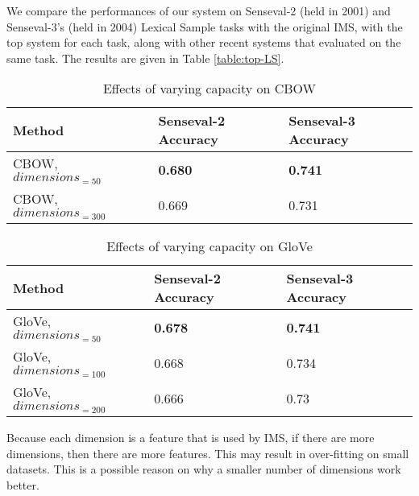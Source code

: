 \documentclass[11pt]{article}
\begin{document}
We compare the performances of our system on Senseval-2 (held in 2001) and Senseval-3's (held in 2004) Lexical Sample tasks with the original IMS, with the top system for each task, along with other recent systems that evaluated on the same task. The results are given in Table \ref{table:top-LS}.


\begin{table}[ht]
	\caption{Effects of varying capacity on CBOW}
	\label{table:wordembeddings-word2vec-accuracy}
	\begin{center}
		\begin{tabular}{| p{7cm} | p{4cm} | p{4cm} |}
			\hline
			Method & Senseval-2 Accuracy & Senseval-3 Accuracy \\
			\hline
			CBOW, $dimensions_{=50}$ & {\bf0.680} & {\bf0.741} \\
			\hline
			CBOW, $dimensions_{=300}$ & 0.669 & 0.731 \\
			\hline
			
		\end{tabular}
	\end{center}
\end{table}

\begin{table}[ht]
	\caption{Effects of varying capacity on GloVe}
	\label{table:wordembeddings-glove-accuracy}
	\begin{center}
		\begin{tabular}{| p{7cm} | p{4cm} | p{4cm} |}
			\hline
			Method & Senseval-2 Accuracy & Senseval-3 Accuracy \\
			\hline
			GloVe, $dimensions_{=50}$ & {\bf0.678} & {\bf0.741} \\
			\hline
			GloVe, $dimensions_{=100}$ & 0.668 & 0.734 \\
			\hline
			GloVe, $dimensions_{=200}$ & 0.666 & 0.73 \\
			\hline
			
		\end{tabular}
	\end{center}
\end{table}



Because each dimension is a feature that is used by IMS, if there are more dimensions, then there are more features. This may result in over-fitting on small datasets. This is a possible reason on why a smaller number of dimensions work better. 
\end{document}
